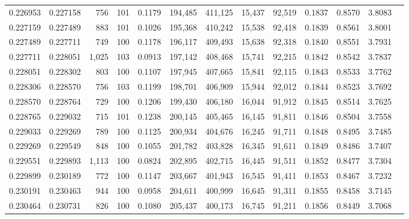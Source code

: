 \begin{tabular}{rrrrrrrrrrrrr}
0.226953 & 0.227158 &   756 & 101 &                                     0.1179 & 194,485 & 411,125 &  15,437 &  92,519 & 0.1837 & 0.8570 & 3.8083 \\
0.227159 & 0.227489 &   883 & 101 &                                     0.1026 & 195,368 & 410,242 &  15,538 &  92,418 & 0.1839 & 0.8561 & 3.8001 \\
0.227489 & 0.227711 &   749 & 100 &                                     0.1178 & 196,117 & 409,493 &  15,638 &  92,318 & 0.1840 & 0.8551 & 3.7931 \\
0.227711 & 0.228051 & 1,025 & 103 &                                     0.0913 & 197,142 & 408,468 &  15,741 &  92,215 & 0.1842 & 0.8542 & 3.7837 \\
0.228051 & 0.228302 &   803 & 100 &                                     0.1107 & 197,945 & 407,665 &  15,841 &  92,115 & 0.1843 & 0.8533 & 3.7762 \\
0.228306 & 0.228570 &   756 & 103 &                                     0.1199 & 198,701 & 406,909 &  15,944 &  92,012 & 0.1844 & 0.8523 & 3.7692 \\
0.228570 & 0.228764 &   729 & 100 &                                     0.1206 & 199,430 & 406,180 &  16,044 &  91,912 & 0.1845 & 0.8514 & 3.7625 \\
0.228765 & 0.229032 &   715 & 101 &                                     0.1238 & 200,145 & 405,465 &  16,145 &  91,811 & 0.1846 & 0.8504 & 3.7558 \\
0.229033 & 0.229269 &   789 & 100 &                                     0.1125 & 200,934 & 404,676 &  16,245 &  91,711 & 0.1848 & 0.8495 & 3.7485 \\
0.229269 & 0.229549 &   848 & 100 &                                     0.1055 & 201,782 & 403,828 &  16,345 &  91,611 & 0.1849 & 0.8486 & 3.7407 \\
0.229551 & 0.229893 & 1,113 & 100 &                                     0.0824 & 202,895 & 402,715 &  16,445 &  91,511 & 0.1852 & 0.8477 & 3.7304 \\
0.229899 & 0.230189 &   772 & 100 &                                     0.1147 & 203,667 & 401,943 &  16,545 &  91,411 & 0.1853 & 0.8467 & 3.7232 \\
0.230191 & 0.230463 &   944 & 100 &                                     0.0958 & 204,611 & 400,999 &  16,645 &  91,311 & 0.1855 & 0.8458 & 3.7145 \\
0.230464 & 0.230731 &   826 & 100 &                                     0.1080 & 205,437 & 400,173 &  16,745 &  91,211 & 0.1856 & 0.8449 & 3.7068 \\

\end{tabular}
